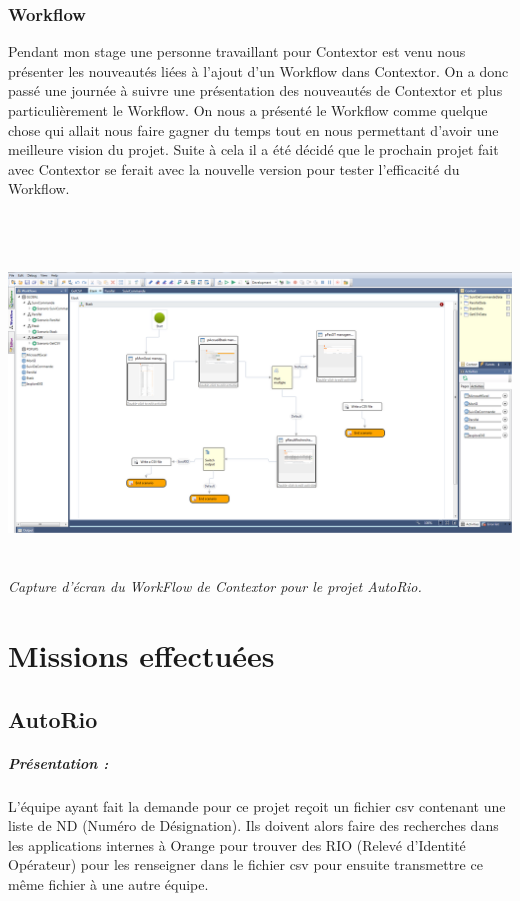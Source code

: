 \documentclass[a4paper,twoside,12pt,openright]{report}
\begin{document}
\subsection{Workflow}
Pendant mon stage une personne travaillant pour Contextor est venu nous présenter les nouveautés liées à l'ajout d'un Workflow dans Contextor. On a donc passé une journée à suivre une présentation des nouveautés de Contextor et plus particulièrement le Workflow. On nous a présenté le Workflow comme quelque chose qui allait nous faire gagner du temps tout en nous permettant d'avoir une meilleure vision du projet. Suite à cela il a été décidé que le prochain projet fait avec Contextor se ferait avec la nouvelle version pour tester l'efficacité du Workflow.
\\\\
\begin{center}
\includegraphics[height=9cm]{workflow2_thibault.PNG}\\
\itshape Capture d'écran du WorkFlow de Contextor pour le projet AutoRio.
\end{center}
\chapter{Missions effectuées}
\section{AutoRio}
\vspace{1cm}
\paragraph {Présentation :}
L'équipe ayant fait la demande pour ce projet reçoit un fichier csv contenant une liste de ND (Numéro de Désignation). Ils doivent alors faire des recherches dans les applications internes à Orange pour trouver des RIO (Relevé d'Identité Opérateur) pour les renseigner dans le fichier csv pour ensuite transmettre ce même fichier à une autre équipe.
\end{document}
